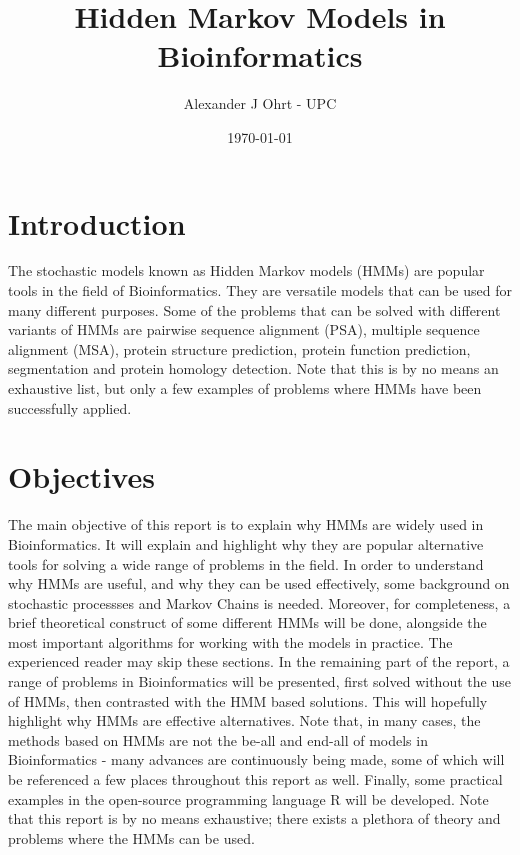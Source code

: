 \documentclass{article}\usepackage[]{graphicx}\usepackage[]{color}
\title{Hidden Markov Models in Bioinformatics}
\author{Alexander J Ohrt - UPC}
\date{\today}
\begin{document}
\maketitle

\tableofcontents

\section{Introduction}
The stochastic models known as Hidden Markov models (HMMs) are popular tools in the field of Bioinformatics. They are versatile models that can be used for many different purposes. Some of the problems that can be solved with different variants of HMMs are pairwise sequence alignment (PSA), multiple sequence alignment (MSA), protein structure prediction, protein function prediction, segmentation and protein homology detection. Note that this is by no means an exhaustive list, but only a few examples of problems where HMMs have been successfully applied. 

\section{Objectives}

The main objective of this report is to explain why HMMs are widely used in Bioinformatics. It will explain and highlight why they are popular alternative tools for solving a wide range of problems in the field. In order to understand why HMMs are useful, and why they can be used effectively, some background on stochastic processses and Markov Chains is needed. Moreover, for completeness, a brief theoretical construct of some different HMMs will be done, alongside the most important algorithms for working with the models in practice. The experienced reader may skip these sections. In the remaining part of the report, a range of problems in Bioinformatics will be presented, first solved without the use of HMMs, then contrasted with the HMM based solutions. This will hopefully highlight why HMMs are effective alternatives. Note that, in many cases, the methods based on HMMs are not the be-all and end-all of models in Bioinformatics - many advances are continuously being made, some of which will be referenced a few places throughout this report as well. Finally, some practical examples in the open-source programming language R will be developed. Note that this report is by no means exhaustive; there exists a plethora of theory and problems where the HMMs can be used. 
\end{document}
